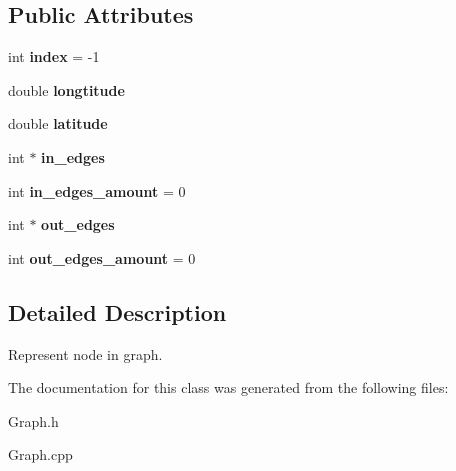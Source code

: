 \subsection*{Public Attributes}
\begin{DoxyCompactItemize}
\item 
int {\bfseries index} = -\/1\hypertarget{class_pathing_lib_1_1_n_o_d_e_abc9b7ea86dacf7ba412b3b1d0850e0cd}{}\label{class_pathing_lib_1_1_n_o_d_e_abc9b7ea86dacf7ba412b3b1d0850e0cd}

\item 
double {\bfseries longtitude}\hypertarget{class_pathing_lib_1_1_n_o_d_e_ade975f2391758b6d4a2b0dec1351ab51}{}\label{class_pathing_lib_1_1_n_o_d_e_ade975f2391758b6d4a2b0dec1351ab51}

\item 
double {\bfseries latitude}\hypertarget{class_pathing_lib_1_1_n_o_d_e_a3071094836ae11861ea814b986c83ebb}{}\label{class_pathing_lib_1_1_n_o_d_e_a3071094836ae11861ea814b986c83ebb}

\item 
int $\ast$ {\bfseries in\+\_\+edges}\hypertarget{class_pathing_lib_1_1_n_o_d_e_a67d0ae55a2ec110ff2d41e913bf1e003}{}\label{class_pathing_lib_1_1_n_o_d_e_a67d0ae55a2ec110ff2d41e913bf1e003}

\item 
int {\bfseries in\+\_\+edges\+\_\+amount} = 0\hypertarget{class_pathing_lib_1_1_n_o_d_e_acdf3b6e360ee2060e985280345c0ddbb}{}\label{class_pathing_lib_1_1_n_o_d_e_acdf3b6e360ee2060e985280345c0ddbb}

\item 
int $\ast$ {\bfseries out\+\_\+edges}\hypertarget{class_pathing_lib_1_1_n_o_d_e_a92cf7b22d05a3a0d0749390372c0b8c1}{}\label{class_pathing_lib_1_1_n_o_d_e_a92cf7b22d05a3a0d0749390372c0b8c1}

\item 
int {\bfseries out\+\_\+edges\+\_\+amount} = 0\hypertarget{class_pathing_lib_1_1_n_o_d_e_aaa496ed8f923d26beed923a07aed25f9}{}\label{class_pathing_lib_1_1_n_o_d_e_aaa496ed8f923d26beed923a07aed25f9}

\end{DoxyCompactItemize}


\subsection{Detailed Description}
Represent node in graph. 

The documentation for this class was generated from the following files\+:\begin{DoxyCompactItemize}
\item 
Graph.\+h\item 
Graph.\+cpp\end{DoxyCompactItemize}
